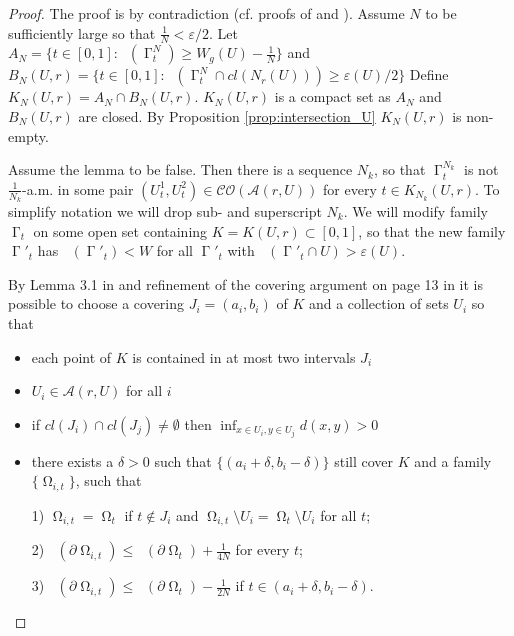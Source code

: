 \documentclass[12pt]{amsart}
\DeclareMathOperator{\Hn}{\mathcal{H}^n}
\DeclareMathOperator{\G}{\Gamma}
\DeclareMathOperator{\Om}{\Omega}
\theoremstyle{definition}
\begin{document}
 
\begin{proof}
The proof is by contradiction (cf. proofs of \cite[5.3]{CD} and \cite[3.4]{DT}).
Assume $N$ to be sufficiently large so that $\frac{1}{N}< \varepsilon/2$.
Let $A_N = \{t \in [0,1]: \Hn(\G_t ^N)\geq W_g(U) - \frac{1}{N} \}$ and 
$B_N(U,r) = \{t \in [0,1]: \Hn(\G_t ^N \cap cl(N_r(U)))\geq \varepsilon(U)/2 \}$
Define $K_N(U,r) = A_N \cap B_N(U,r)$.
 $K_N(U,r)$ is a compact set as $A_N$ and $B_N(U,r)$ are closed.
 By Proposition \ref*{prop:intersection_U} $K_N(U,r)$ is non-empty.

Assume the lemma to be false. Then there is a sequence $N_k$,
so that $\G_t^{N_k}$ is not $\frac{1}{N_k}$-a.m. in some pair $(U^1_t, U^2_t) \in \mathcal{CO}(\mathcal{A}(r,U))$
for every $t \in K_{N_k}(U,r)$. To simplify notation we will drop sub- and superscript $N_k$.
We will modify family $\G_t$ on some open set containing $K=K(U,r) \subset [0,1]$, so that the new family $\G'_t$ has
$\Hn(\G'_t) < W$ for all $\G'_t$ with $\Hn(\G'_t \cap U) > \varepsilon(U)$.

By Lemma 3.1 in \cite{DT} and refinement of the covering
argument on page 13 in \cite{DT} 
it is possible to choose a covering $J_i=(a_i,b_i)$ of $K$
and a collection of sets $U_i$ so that

\begin{itemize}
    \item each point of $K$ is contained in at most
    two intervals $J_i$
    \item  $U_i \in \mathcal{A}(r,U)$ for all $i$
    \item if $cl(J_i) \cap cl(J_j) \neq \emptyset$ then
    $\inf_{x \in U_i, y \in U_j} d(x,y) >0$
    \item there exists a $\delta>0$ such 
    that $\{(a_i+ \delta,b_i-\delta)\}$ still cover $K$ and
    a family $\{\Om_{i,t} \}$,
    such that 
    
    1) $\Om_{i,t} = \Om_t$ if $t \notin J_i$
    and $\Om_{i,t} \setminus U_i = \Om_{t} \setminus U_i$ 
    for all $t$; 
    
    2) $\Hn (\partial \Om_{i,t}) \leq 
    \Hn (\partial \Om_{t}) + \frac{1}{4N}$ for every $t$;
    
    3) $\Hn (\partial \Om_{i,t}) \leq 
    \Hn (\partial \Om_{t}) - \frac{1}{2N}$
    if $t \in (a_i+ \delta,b_i-\delta)$.
\end{itemize}



\end{proof}
\end{document}
